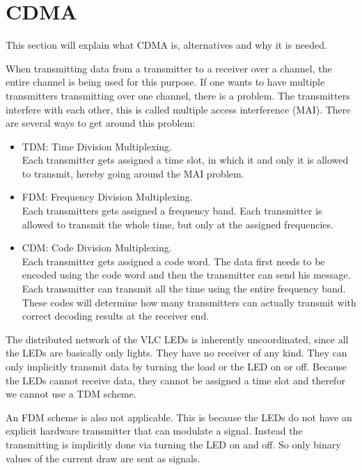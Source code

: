 
\section{CDMA}
\label{sec:CDMA}

	This section will explain what CDMA is, alternatives and why it is needed.

	When transmitting data from a transmitter to a receiver over a channel, the entire channel is being used for this purpose.
	If one wants to have multiple transmitters transmitting over one channel, there is a problem. 
	The transmitters interfere with each other, this is called multiple access interference (MAI). 
	There are several ways to get around this problem: 

	\begin{itemize}
		\item TDM: Time Division Multiplexing. \\
				Each transmitter gets assigned a time slot, in which it and only it is allowed to transmit, hereby going around the MAI problem.
		\item FDM: Frequency Division Multiplexing. \\
				Each transmitters gets assigned a frequency band. Each transmitter is allowed to transmit the whole time, but only at the assigned frequencies.
		\item CDM: Code Division Multiplexing. \\
				Each transmitter gets assigned a code word. 
				The data first needs to be encoded using the code word and then the transmitter can send his message. 
				Each transmitter can transmit all the time using the entire frequency band. 
				These codes will determine how many transmitters can actually transmit with correct decoding results at the receiver end.
	\end{itemize}

	The distributed network of the VLC LEDs is inherently uncoordinated, since all the LEDs are basically only lights. 
	They have no receiver of any kind. 
	They can only implicitly transmit data by turning the load or the LED on or off.
	Because the LEDs cannot receive data, they cannot be assigned a time slot and therefor we cannot use a TDM scheme.

	An FDM scheme is also not applicable.
	This is because the LEDs do not have an explicit hardware transmitter that can modulate a signal.
	Instead the transmitting is implicitly done via turning the LED on and off.
	So only binary values of the current draw are sent as signals.

